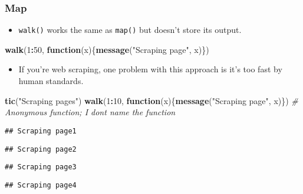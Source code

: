 \documentclass[
]{book}
\newenvironment{Shaded}{\begin{snugshade}}{\end{snugshade}}
\newcommand{\CommentTok}[1]{\textcolor[rgb]{0.56,0.35,0.01}{\textit{#1}}}
\newcommand{\ControlFlowTok}[1]{\textcolor[rgb]{0.13,0.29,0.53}{\textbf{#1}}}
\newcommand{\DecValTok}[1]{\textcolor[rgb]{0.00,0.00,0.81}{#1}}
\newcommand{\KeywordTok}[1]{\textcolor[rgb]{0.13,0.29,0.53}{\textbf{#1}}}
\newcommand{\NormalTok}[1]{#1}
\newcommand{\OperatorTok}[1]{\textcolor[rgb]{0.81,0.36,0.00}{\textbf{#1}}}
\newcommand{\StringTok}[1]{\textcolor[rgb]{0.31,0.60,0.02}{#1}}
\providecommand{\tightlist}{%
  \setlength{\itemsep}{0pt}\setlength{\parskip}{0pt}}
\begin{document}
\hypertarget{map}{%
\subsubsection{Map}\label{map}}

\begin{itemize}
\tightlist
\item
  \texttt{walk()} works the same as \texttt{map()} but doesn't store its output.
\end{itemize}

\begin{Shaded}
\begin{Highlighting}[]
\KeywordTok{walk}\NormalTok{(}\DecValTok{1}\OperatorTok{:}\DecValTok{50}\NormalTok{, }\ControlFlowTok{function}\NormalTok{(x)\{}\KeywordTok{message}\NormalTok{(}\StringTok{"Scraping page"}\NormalTok{, x)\})}
\end{Highlighting}
\end{Shaded}

\begin{itemize}
\tightlist
\item
  If you're web scraping, one problem with this approach is it's too fast by human standards.
\end{itemize}

\begin{Shaded}
\begin{Highlighting}[]
\KeywordTok{tic}\NormalTok{(}\StringTok{"Scraping pages"}\NormalTok{)}
\KeywordTok{walk}\NormalTok{(}\DecValTok{1}\OperatorTok{:}\DecValTok{10}\NormalTok{, }\ControlFlowTok{function}\NormalTok{(x)\{}\KeywordTok{message}\NormalTok{(}\StringTok{"Scraping page"}\NormalTok{, x)\}) }\CommentTok{\# Anonymous function; I don\textquotesingle{}t name the function }
\end{Highlighting}
\end{Shaded}

\begin{verbatim}
## Scraping page1
\end{verbatim}

\begin{verbatim}
## Scraping page2
\end{verbatim}

\begin{verbatim}
## Scraping page3
\end{verbatim}

\begin{verbatim}
## Scraping page4
\end{verbatim}
\end{document}
